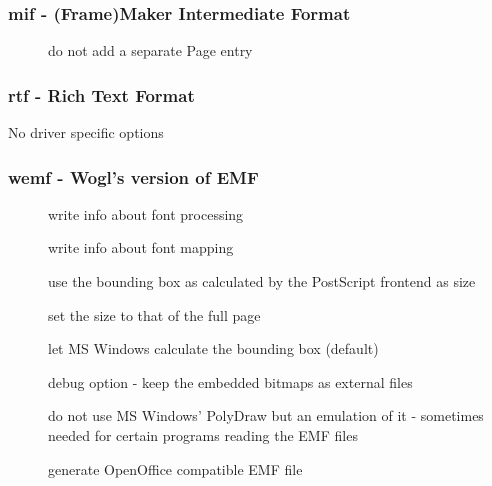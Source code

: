 \documentclass[english,a4paper]{article}
\begin{document}
\subsubsection{mif - (Frame)Maker Intermediate Format}
\begin{description}
\item[]
do not add a separate Page entry


\end{description}
\subsubsection{rtf - Rich Text Format}
No driver specific options
\subsubsection{wemf - Wogl's version of EMF}
\begin{description}
\item[]
write info about font processing


\item[]
write info about font mapping


\item[]
use the bounding box as calculated by the PostScript frontend as size


\item[]
set the size to that of the full page


\item[]
let MS Windows calculate the bounding box (default)


\item[]
debug option - keep the embedded bitmaps as external files


\item[]
do not use MS Windows' PolyDraw but an emulation of it - sometimes needed for certain programs reading the EMF files


\item[]
generate OpenOffice compatible EMF file


\end{description}
\end{document}

